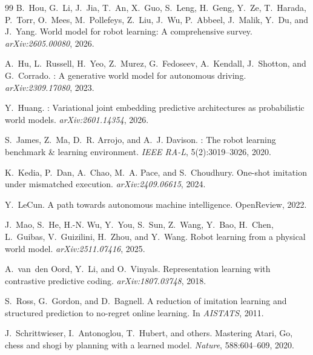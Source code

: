 \documentclass[10pt,twocolumn]{article}
\theoremstyle{tightstyle}
\begin{document}
\begin{thebibliography}{99}
B.~Hou, G.~Li, J.~Jia, T.~An, X.~Guo, S.~Leng, H.~Geng, Y.~Ze,
T.~Harada, P.~Torr, O.~Mees, M.~Pollefeys, Z.~Liu, J.~Wu,
P.~Abbeel, J.~Malik, Y.~Du, and J.~Yang.
\newblock World model for robot learning: A comprehensive survey.
\newblock \emph{arXiv:2605.00080}, 2026.

A.~Hu, L.~Russell, H.~Yeo, Z.~Murez, G.~Fedoseev, A.~Kendall,
J.~Shotton, and G.~Corrado.
: A generative world model for autonomous driving.
\newblock \emph{arXiv:2309.17080}, 2023.

Y.~Huang.
: Variational joint embedding predictive architectures as
probabilistic world models.
\newblock \emph{arXiv:2601.14354}, 2026.

S.~James, Z.~Ma, D.~R. Arrojo, and A.~J. Davison.
: The robot learning benchmark \& learning environment.
\newblock \emph{IEEE RA-L}, 5(2):3019--3026, 2020.

K.~Kedia, P.~Dan, A.~Chao, M.~A. Pace, and S.~Choudhury.
\newblock One-shot imitation under mismatched execution.
\newblock \emph{arXiv:2409.06615}, 2024.

Y.~LeCun.
\newblock A path towards autonomous machine intelligence.
\newblock OpenReview, 2022.

J.~Mao, S.~He, H.-N. Wu, Y.~You, S.~Sun, Z.~Wang, Y.~Bao, H.~Chen,
L.~Guibas, V.~Guizilini, H.~Zhou, and Y.~Wang.
\newblock Robot learning from a physical world model.
\newblock \emph{arXiv:2511.07416}, 2025.

A.~van~den Oord, Y.~Li, and O.~Vinyals.
\newblock Representation learning with contrastive predictive coding.
\newblock \emph{arXiv:1807.03748}, 2018.

S.~Ross, G.~Gordon, and D.~Bagnell.
\newblock A reduction of imitation learning and structured prediction to no-regret online learning.
\newblock In \emph{AISTATS}, 2011.

J.~Schrittwieser, I.~Antonoglou, T.~Hubert, and others.
\newblock Mastering Atari, Go, chess and shogi by planning with a learned model.
\newblock \emph{Nature}, 588:604--609, 2020.


\end{thebibliography}
\end{document}
